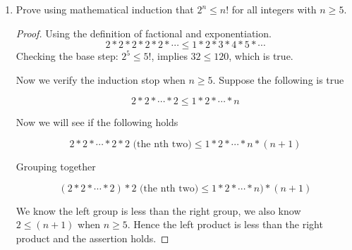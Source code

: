 \documentclass[12pt]{article}
\begin{document}
\begin{enumerate}
		\item Prove using mathematical induction that $2^n\leq n!$ for all integers with $n\geq 5$.
		
		\begin{proof}
			Using the definition of factional and exponentiation.
			\[
			2*2*2*2*2*\dotsm\leq 1*2*3*4*5*\dotsm
			\]
			Checking the base step: $2^5\leq 5!$, implies $32\leq 120$, which is true.
			
			Now we verify the induction stop when $n\geq 5$. Suppose the following is true
			
			\[
			2*2*\dotsm*2\leq 1*2*\dotsm*n
			\]
			
			Now we will see if the following holds
			
			\[
			2*2*\dotsm*2*2 \text{ (the nth two)}\leq 1*2*\dotsm*n*(n+1)
			\]
			
			Grouping together
			
			\[
			(2*2*\dotsm*2)*2 \text{ (the nth two)}\leq 1*2*\dotsm*n)*(n+1)
			\]
			
			We know the left group is less than the right group, we also know $2\leq (n+1)$ when $n\geq 5$. Hence the left product is less than the right product and the assertion holds.
			
		\end{proof}
		
		\end{enumerate}
	
\end{document}
